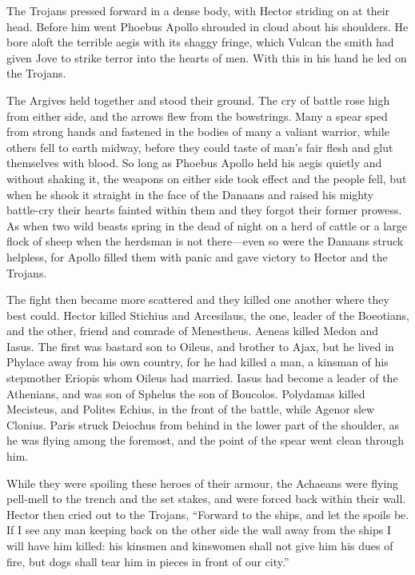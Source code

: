 The Trojans pressed forward in a dense body, with Hector striding on at
their head. Before him went Phoebus Apollo shrouded in cloud about his
shoulders. He bore aloft the terrible aegis with its shaggy fringe, which
Vulcan the smith had given Jove to strike terror into the hearts of men.
With this in his hand he led on the Trojans.

The Argives held together and stood their ground. The cry of battle rose
high from either side, and the arrows flew from the bowstrings. Many a
spear sped from strong hands and fastened in the bodies of many a valiant
warrior, while others fell to earth midway, before they could taste of
man’s fair flesh and glut themselves with blood. So long as Phoebus Apollo
held his aegis quietly and without shaking it, the weapons on either side
took effect and the people fell, but when he shook it straight in the face
of the Danaans and raised his mighty battle-cry their hearts fainted
within them and they forgot their former prowess. As when two wild beasts
spring in the dead of night on a herd of cattle or a large flock of sheep
when the herdsman is not there—even so were the Danaans struck
helpless, for Apollo filled them with panic and gave victory to Hector and
the Trojans.

The fight then became more scattered and they killed one another where
they best could. Hector killed Stichius and Arcesilaus, the one, leader of
the Boeotians, and the other, friend and comrade of Menestheus. Aeneas
killed Medon and Iasus. The first was bastard son to Oileus, and brother
to Ajax, but he lived in Phylace away from his own country, for he had
killed a man, a kinsman of his stepmother Eriopis whom Oileus had married.
Iasus had become a leader of the Athenians, and was son of Sphelus the son
of Boucolos. Polydamas killed Mecisteus, and Polites Echius, in the front
of the battle, while Agenor slew Clonius. Paris struck Deiochus from
behind in the lower part of the shoulder, as he was flying among the
foremost, and the point of the spear went clean through him.

While they were spoiling these heroes of their armour, the Achaeans were
flying pell-mell to the trench and the set stakes, and were forced back
within their wall. Hector then cried out to the Trojans, “Forward to the
ships, and let the spoils be. If I see any man keeping back on the other
side the wall away from the ships I will have him killed: his kinsmen and
kinswomen shall not give him his dues of fire, but dogs shall tear him in
pieces in front of our city.”

